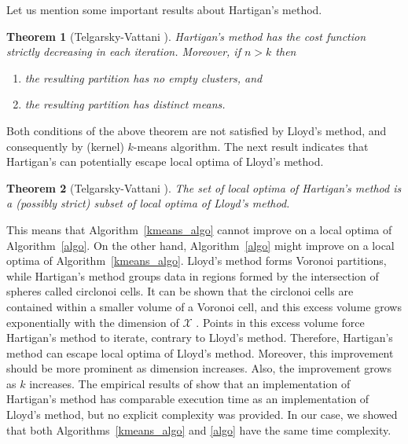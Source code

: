 \documentclass[aps,preprint,nofootinbib,floatfix]{revtex4-1}
\newtheorem{theorem}{Theorem}
\begin{document}
Let us mention some important results about Hartigan's method.

\begin{theorem}[Telgarsky-Vattani \cite{Telgarsky}]
Hartigan's method has the cost function strictly decreasing in each
iteration. Moreover, if $n > k$ then 
\begin{enumerate}
\item \label{noempty} the resulting partition has no empty clusters, and
\item \label{diffmean} the resulting partition has distinct means.
\end{enumerate}
\end{theorem}

Both conditions of the  above theorem are not satisfied 
by Lloyd's method, 
and consequently by (kernel) $k$-means algorithm.
The next result indicates that Hartigan's can potentially 
escape local optima of Lloyd's method.

\begin{theorem}[Telgarsky-Vattani \cite{Telgarsky}]
The set of local optima of Hartigan's method is a (possibly strict) subset
of local optima of Lloyd's method.
\end{theorem}

This means that Algorithm~\ref{kmeans_algo} cannot
improve on a local optima of Algorithm~\ref{algo}. On the other hand,
Algorithm~\ref{algo} might improve on a local optima of 
Algorithm~\ref{kmeans_algo}. Lloyd's method forms Voronoi partitions,
while Hartigan's method groups data
in regions formed by the intersection of spheres called circlonoi cells.
It can be shown that the circlonoi cells are contained within
a smaller volume of a Voronoi cell, and this excess volume grows
exponentially with the dimension of $\mathcal{X}$ 
\cite[Theorems 2.4 and 3.1]{Telgarsky}. 
Points in this excess volume
force Hartigan's method to iterate, contrary
to Lloyd's method. Therefore, Hartigan's method 
can escape local
optima of Lloyd's method. 
Moreover, this improvement should be more prominent as
dimension increases. Also, the improvement grows as $k$
increases.
The empirical results of \cite{Telgarsky} show that 
an implementation of Hartigan's method has comparable execution time 
as an implementation of
Lloyd's method,
but no explicit complexity was provided. In our case, we showed that both
Algorithms~\ref{kmeans_algo} and \ref{algo} have the same time complexity.
\end{document}
